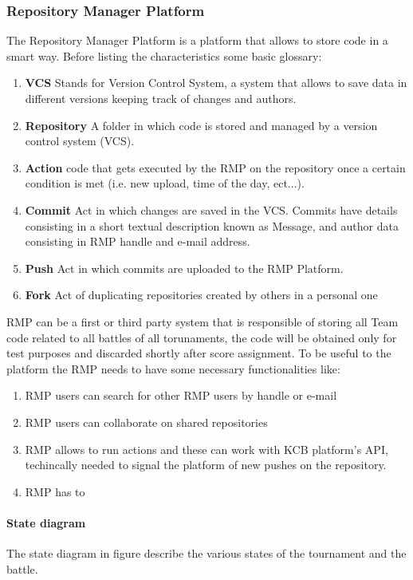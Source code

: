 \subsubsection{Repository Manager Platform}
The Repository Manager Platform is a platform that allows to store code in a smart way. Before listing the characteristics some basic glossary:\\
\begin{enumerate}
    \item \textbf{VCS} Stands for Version Control System, a system that allows to save data in different versions keeping track of changes and authors.
    \item \textbf{Repository} A folder in which code is stored and managed by a version control system (VCS).
    \item \textbf{Action} code that gets executed by the RMP on the repository once a certain condition is met (i.e. new upload, time of the day, ect...).
    \item \textbf{Commit} Act in which changes are saved in the VCS. Commits have details consisting in a short textual description known as Message, and author data consisting in RMP handle and e-mail address.
    \item \textbf{Push} Act in which commits are uploaded to the RMP Platform.
    \item \textbf{Fork} Act of duplicating repositories created by others in a personal one
\end{enumerate}
RMP can be a first or third party system that is responsible of storing all Team code related to all battles of all torunaments, the code will be obtained only for test purposes and discarded shortly after score assignment. 
To be useful to the platform the RMP needs to have some necessary functionalities like:
\begin{enumerate}
    \item RMP users can search for other RMP users by handle or e-mail
    \item RMP users can collaborate on shared repositories
    \item RMP allows to run actions and these can work with KCB platform's API, techincally needed to signal the platform of new pushes on the repository.
    \item RMP has to 
\end{enumerate}
\paragraph{State diagram}
The state diagram in figure describe the various states of the tournament and the battle.

